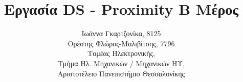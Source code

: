 \usepackage[Greek,Latin]{ucharclasses}

\usepackage{polyglossia}
\setmainlanguage{greek}

\usepackage{fontspec}
\setmainfont[Mapping=tex-text]{DejaVu Sans}
\newfontfamily{}
\newfontfamily{}
\setmonofont[Scale=1.0]{Source Code Pro Medium}
\newfontfamily{}
\usepackage{microtype} %
\title{Εργασία DS - Proximity Β Μέρος}
\author{Ιωάννα Γκαρτζονίκα, 8125\\
Ορέστης Φλώρος-Μαλιβίτσης, 7796\\
  Τομέας Ηλεκτρονικής,\\
  Τμήμα Ηλ. Μηχανικών / Μηχανικών ΗΥ,\\
  Αριστοτέλειο Πανεπιστήμιο Θεσσαλονίκης}

\maketitle
\tableofcontents
\listoffigures
\newpage







